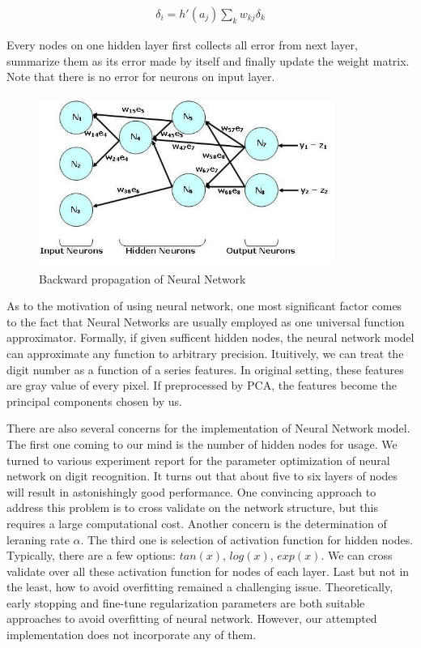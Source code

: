 \documentclass{article} %
\begin{document}
\begin{align}
    \delta_i = h'(a_j) \sum_{k} w_{kj} \delta_k
\end{align}

Every nodes on one hidden layer first collects all
error from next layer, summarize them as its error made by itself and finally
update the weight matrix. Note that there is no error for neurons on input
layer. 

\begin{figure}[h]
    \centering
    \includegraphics[height=2.2in,width=3.8in]{./images/BackPropagation.jpg}
    \caption{Backward propagation of Neural Network}
\end{figure}


As to the motivation of using neural network, one most significant factor
comes to the fact that Neural Networks are usually employed as one universal
function approximator. Formally, if given sufficent hidden nodes, the neural
network model can approximate any function to arbitrary precision. Ituitively,
we can treat the digit number as a function of a series features. In original
setting, these features are gray value of every pixel. If preprocessed by PCA,
the features become the principal components chosen by us. 

There are also several concerns for the implementation of Neural Network model.
The first one coming to our mind is the number of hidden nodes for usage. We
turned to various experiment report for the parameter optimization of neural
network on digit recognition. It turns out that about five to six layers of
nodes will result in astonishingly good performance. One convincing approach
to address this problem is to cross validate on the network structure, but
this requires a large computational cost.
Another concern is the determination of leraning rate $\alpha$. The third one
is selection of activation function for hidden nodes. Typically, there are a
few options: $tan(x)$, $log(x)$, $exp(x)$. We can cross validate over all
these activation function for nodes of each layer. Last but not in the least,
 how to avoid overfitting remained a challenging issue. Theoretically, early
 stopping and fine-tune regularization parameters are both suitable approaches
 to avoid overfitting of neural network. However, our attempted implementation
 does not incorporate any of them. 
\end{document}
